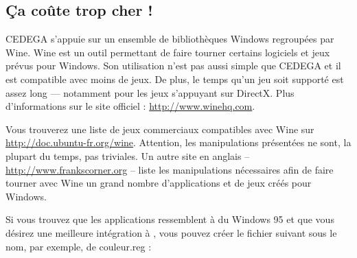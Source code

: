 \subsection{Ça coûte trop cher !}
CEDEGA s'appuie sur un ensemble de bibliothèques Windows regroupées par Wine. Wine est un outil  permettant de faire tourner certains logiciels et jeux prévus pour Windows. Son utilisation n'est pas aussi simple que CEDEGA et il est compatible avec moins de jeux. De plus, le temps qu'un jeu soit supporté est assez long --- notamment pour les jeux s'appuyant sur DirectX. Plus d'informations sur le site officiel : \url{http://www.winehq.com}.\par
{}
\begin{nota}
Vous trouverez une liste de jeux commerciaux compatibles avec Wine sur \url{http://doc.ubuntu-fr.org/wine}. Attention, les manipulations présentées ne sont, la plupart du temps, pas triviales. Un autre site en anglais -- \url{http://www.frankscorner.org} -- liste les manipulations nécessaires afin de faire tourner avec Wine un grand nombre d'applications et de jeux créés pour Windows.
\end{nota}
Si vous trouvez que les applications ressemblent à du Windows 95 et que vous désirez une meilleure intégration à , vous pouvez créer le fichier  suivant sous le nom, par exemple, de couleur.reg :\\
